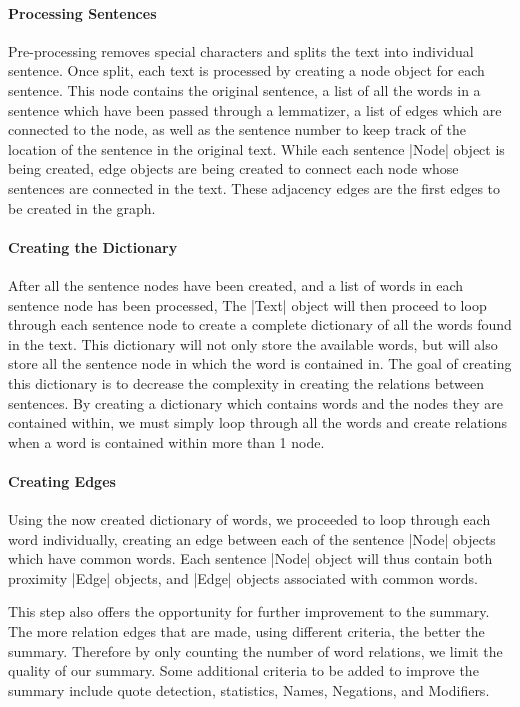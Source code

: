 	\paragraph{Processing Sentences}
		
		Pre-processing removes special characters and splits the text into individual sentence. Once split, each text is processed by creating a node object for each sentence. This node contains the original sentence, a list of all the words in a sentence which have been passed through a lemmatizer, a list of edges which are connected to the node, as well as the sentence number to keep track of the location of the sentence in the original text. While each sentence |Node| object is being created, edge objects are being created to connect each node whose sentences are connected in the text. These adjacency edges are the first edges to be created in the graph.
	
	\paragraph{Creating the Dictionary}
	
		After all the sentence nodes have been created, and a list of words in each sentence node has been processed, The |Text| object will then proceed to loop through each sentence node to create a complete dictionary of all the words found in the text. This dictionary will not only store the available words, but will also store all the sentence node in which the word is contained in. The goal of creating this dictionary is to decrease the complexity in creating the relations between sentences. By creating a dictionary which contains words and the nodes they are contained within, we must simply loop through all the words and create relations when a word is contained within more than 1 node.
		
	\paragraph{Creating Edges}
	
		Using the now created dictionary of words, we proceeded to loop through each word individually, creating an edge between each of the sentence |Node| objects which have common words. Each sentence |Node| object will thus contain both proximity |Edge| objects, and |Edge| objects associated with common words.
		
		This step also offers the opportunity for further improvement to the summary. The more relation edges that are made, using different criteria, the better the summary. Therefore by only counting the number of word relations, we limit the quality of our summary. Some additional criteria to be added to improve the summary include quote detection, statistics, Names, Negations, and Modifiers.
		

